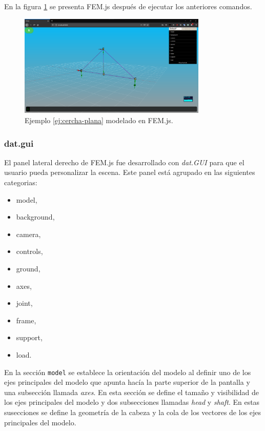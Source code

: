 En la figura \ref{fig:FEM.js-cercha-plana} se presenta FEM.js después de ejecutar los anteriores comandos.

\begin{figure}[ht]
  \centering
  \includegraphics[width=0.8\textwidth]{introduction/FEM.js-cercha-plana.png}
  \caption{Ejemplo \ref{ej:cercha-plana} modelado en FEM.js.}
  \label{fig:FEM.js-cercha-plana}
\end{figure}

\subsubsection{dat.gui}
El panel lateral derecho de FEM.js fue desarrollado con \emph{dat.GUI} para que el usuario pueda personalizar la escena. Este panel está agrupado en las siguientes categorias:

\begin{multicols}{2}
  \begin{itemize}
  \item model,
  \item background,
  \item camera,
  \item controls,
  \item ground,
  \item axes,
  \item joint,
  \item frame,
  \item support,
  \item load.
  \end{itemize}
\end{multicols}

En la sección \verb|model| se establece la orientación del modelo al definir uno de los ejes principales del modelo que apunta hacía la parte superior de la pantalla y una subsección llamada \emph{axes}. En esta sección se define el tamaño y visibilidad de los ejes principales del modelo y dos subsecciones llamadas \emph{head} y \emph{shaft}. En estas susecciones se define la geometría de la cabeza y la cola de los vectores de los ejes principales del modelo.\\

